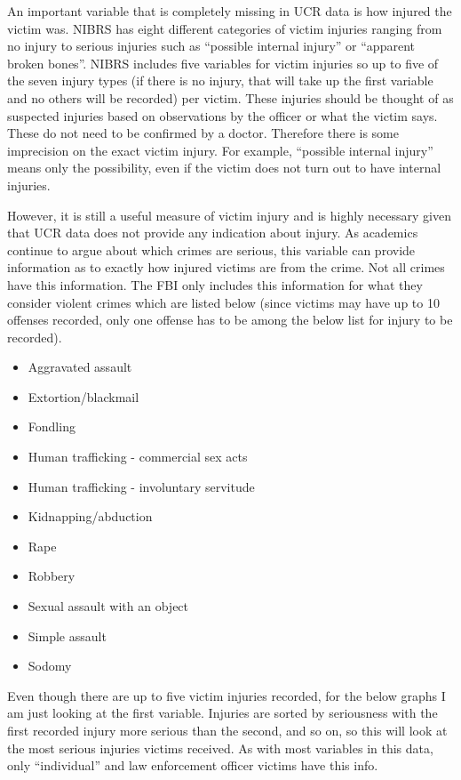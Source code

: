 \documentclass[
]{krantz}
\providecommand{\tightlist}{%
  \setlength{\itemsep}{0pt}\setlength{\parskip}{0pt}}
\begin{document}
An important variable that is completely missing in UCR data
is how injured the victim was. NIBRS has eight different
categories of victim injuries ranging from no injury to
serious injuries such as ``possible internal injury'' or
``apparent broken bones''. NIBRS includes five variables for
victim injuries so up to five of the seven injury types (if
there is no injury, that will take up the first variable and
no others will be recorded) per victim. These injuries
should be thought of as suspected injuries based on
observations by the officer or what the victim says. These
do not need to be confirmed by a doctor. Therefore there is
some imprecision on the exact victim injury. For example,
``possible internal injury'' means only the possibility,
even if the victim does not turn out to have internal
injuries.

However, it is still a useful measure of victim injury and
is highly necessary given that UCR data does not provide any
indication about injury. As academics continue to argue
about which crimes are serious, this variable can provide
information as to exactly how injured victims are from the
crime. Not all crimes have this information. The FBI only
includes this information for what they consider violent
crimes which are listed below (since victims may have up to
10 offenses recorded, only one offense has to be among the
below list for injury to be recorded).

\begin{itemize}
\tightlist
\item
  Aggravated assault
\item
  Extortion/blackmail
\item
  Fondling
\item
  Human trafficking - commercial sex acts
\item
  Human trafficking - involuntary servitude
\item
  Kidnapping/abduction
\item
  Rape
\item
  Robbery
\item
  Sexual assault with an object
\item
  Simple assault
\item
  Sodomy
\end{itemize}

Even though there are up to five victim injuries recorded,
for the below graphs I am just looking at the first
variable. Injuries are sorted by seriousness with the first
recorded injury more serious than the second, and so on, so
this will look at the most serious injuries victims
received. As with most variables in this data, only
``individual'' and law enforcement officer victims have this
info.
\end{document}
